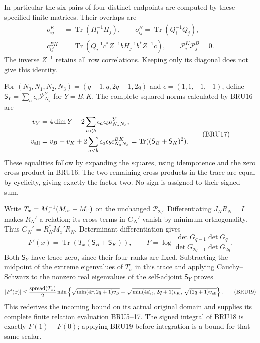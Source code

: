 In particular the six pairs of four distinct endpoints are
computed by these specified finite matrices. Their overlaps are
\[
 \begin{aligned}
 o_{ij}^K&=\operatorname{Tr}(H_i^{-1}H_j),\qquad
 o_{ij}^B=\operatorname{Tr}(Q_i^{-1}Q_j),\\
 c_{ij}^{BK}&=\operatorname{Tr}
 (Q_i^{-1}c^*Z^{-1}bH_j^{-1}b^*Z^{-1}c),\qquad
 \mathcal P_i^K\mathcal P_j^B=0.
 \end{aligned}\tag{BRU16}
\]
The inverse $Z^{-1}$ retains all row correlations. Keeping only
its diagonal does not give this identity.

For $(N_0,N_1,N_2,N_3)=(q-1,q,2q-1,2q)$ and
$\epsilon=(1,1,-1,-1)$, define
$\mathsf S_Y=\sum_a\epsilon_a\mathcal P_{N_a}^Y$ for $Y=B,K$.
The complete squared norms calculated by BRU16 are
\[
 \begin{aligned}
 v_Y&=4\dim Y+2\sum_{a<b}\epsilon_a\epsilon_b o^Y_{N_aN_b},\\
 v_{\rm all}&=v_B+v_K+
             2\sum_{a<b}\epsilon_a\epsilon_b c^{BK}_{N_aN_b}
             =\operatorname{Tr}((\mathsf S_B+\mathsf S_K)^2).
 \end{aligned}\tag{BRU17}
\]
These equalities follow by expanding the squares, using idempotence
and the zero cross product in BRU16. The two remaining cross products
in the trace are equal by cyclicity, giving exactly the factor two.
No sign is assigned to their signed sum.

Write $T_x=M_x^{-1}(M_{\rm ar}-M_\Gamma)$ on the unchanged
$\mathcal P_{2q}$. Differentiating $J_NR_N=I$ makes $R_N'$ a
relation; its cross terms in $G_N'$ vanish by minimum orthogonality.
Thus $G_N'=R_N^*M_x'R_N$. Determinant differentiation gives
\[
 F'(x)=\operatorname{Tr}(T_x(\mathsf S_B+\mathsf S_K)),\qquad
 F=\log\frac{\det G_{q-1}\det G_q}{\det G_{2q-1}\det G_{2q}}.
 \tag{BRU18}
\]
Both $\mathsf S_Y$ have trace zero, since their four ranks are fixed.
Subtracting the midpoint of the extreme eigenvalues of $T_x$ in
this trace and applying Cauchy--Schwarz to the nonzero real
eigenvalues of the self-adjoint $\mathsf S_Y$ proves
\[
 |F'(x)|\leq\frac{\operatorname{spread}(T_x)}2
 \min\left\{\sqrt{\min(4r,2q+1)v_B}
            +\sqrt{\min(4d_K,2q+1)v_K},\,
                    \sqrt{(2q+1)v_{\rm all}}\right\}.
 \tag{BRU19}
\]
This rederives the incoming bound on its actual original domain
and supplies its complete finite relation evaluation BRU5--17.
The signed integral of BRU18 is exactly $F(1)-F(0)$; applying
BRU19 before integration is a bound for that same scalar.

